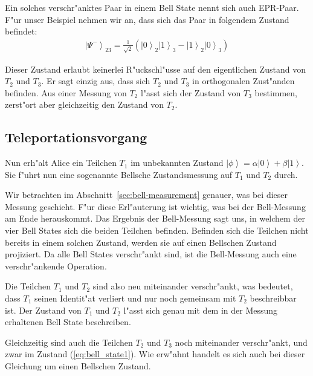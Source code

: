 \begin{refsection}
Ein solches verschr"anktes Paar in einem Bell State nennt sich auch EPR-Paar. F"ur unser Beispiel nehmen wir an, dass sich das Paar in folgendem Zustand befindet:
%
\begin{align}\label{eq:bell_state1}
\left|\Psi^{-}\right\rangle_{23} = \frac{1}{\sqrt{2}} ( \left|0\right\rangle_{2}\left|1\right\rangle_{3} - \left|1\right\rangle_{2}\left|0\right\rangle_{3} )
\end{align}

Dieser Zustand erlaubt keinerlei R"uckschl"usse auf den eigentlichen Zustand von $T_{2}$ und $T_{3}$. Er sagt einzig aus, dass sich $T_{2}$ und $T_{3}$ in orthogonalen Zust"anden befinden. Aus einer Messung von $T_{2}$ l"asst sich der Zustand von $T_{3}$ bestimmen, zerst"ort aber gleichzeitig den Zustand von $T_{2}$. 

\subsection{Teleportationsvorgang}\label{sec:teleportation}

Nun erh"alt Alice ein Teilchen $T_{1}$ im unbekannten Zustand $\left|\phi\right\rangle = \alpha\left|0\right\rangle + \beta\left|1\right\rangle$. Sie f"uhrt nun eine sogenannte Bellsche Zustandsmessung auf $T_{1}$ und $T_{2}$ durch.

Wir betrachten im Abschnitt~\ref{sec:bell-measurement} genauer, was bei dieser Messung geschieht. F"ur diese Erl"auterung ist wichtig, was bei der Bell-Messung am Ende herauskommt. Das Ergebnis der Bell-Messung sagt uns, in welchem der vier Bell States sich die beiden Teilchen befinden. Befinden sich die Teilchen nicht bereits in einem solchen Zustand, werden sie auf einen Bellschen Zustand projiziert. Da alle Bell States verschr"ankt sind, ist die Bell-Messung auch eine verschr"ankende Operation.

Die Teilchen $T_{1}$ und $T_{2}$ sind also neu miteinander verschr"ankt, was bedeutet, dass $T_{1}$ seinen Identit"at verliert und nur noch gemeinsam mit $T_{2}$ beschreibbar ist. Der Zustand von $T_{1}$ und $T_{2}$ l"asst sich genau mit dem in der Messung erhaltenen Bell State beschreiben. 

Gleichzeitig sind auch die Teilchen $T_{2}$ und $T_{3}$ noch miteinander verschr"ankt, und zwar im Zustand (\ref{eq:bell_state1}). Wie erw"ahnt handelt es sich auch bei dieser Gleichung um einen Bellschen Zustand.


\end{refsection}
